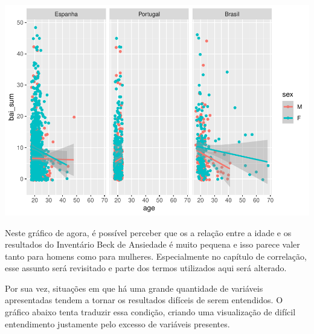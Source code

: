 \documentclass[
]{book}
\newenvironment{Shaded}{\begin{snugshade}}{\end{snugshade}}
\newcommand{\DataTypeTok}[1]{\textcolor[rgb]{0.13,0.29,0.53}{#1}}
\newcommand{\KeywordTok}[1]{\textcolor[rgb]{0.13,0.29,0.53}{\textbf{#1}}}
\newcommand{\NormalTok}[1]{#1}
\newcommand{\OperatorTok}[1]{\textcolor[rgb]{0.81,0.36,0.00}{\textbf{#1}}}
\newcommand{\StringTok}[1]{\textcolor[rgb]{0.31,0.60,0.02}{#1}}
\begin{document}
\begin{center}\includegraphics{gitbook-demo_files/figure-latex/unnamed-chunk-28-1} \end{center}

Neste gráfico de agora, é possível perceber que os a relação entre a idade e os resultados do Inventário Beck de Ansiedade é muito pequena e isso parece valer tanto para homens como para mulheres. Especialmente no capítulo de correlação, esse assunto será revisitado e parte dos termos utilizados aqui será alterado.

Por sua vez, situações em que há uma grande quantidade de variáveis apresentadas tendem a tornar os resultados difíceis de serem entendidos. O gráfico abaixo tenta traduzir essa condição, criando uma visualização de difícil entendimento justamente pelo excesso de variáveis presentes.

\begin{Shaded}
\end{Shaded}
\end{document}
